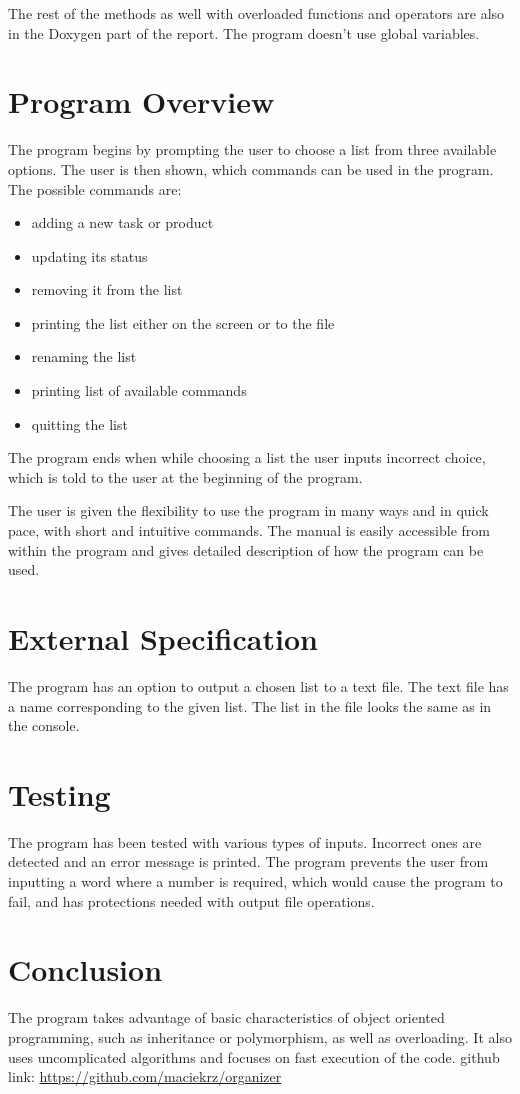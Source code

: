 \documentclass{article}
\begin{document}
The rest of the methods as well with overloaded functions and operators are also in the Doxygen part of the report.
The program doesn't use global variables.

\pagebreak

\section{Program Overview}

The program begins by prompting the user to choose a list from three available options. The user is then shown, which commands can be used in the program. The possible commands are:
\begin{itemize}
\item adding a new task or product
\item updating its status
\item removing it from the list
\item printing the list either on the screen or to the file
\item renaming the list
\item printing list of available commands
\item quitting the list
\end{itemize}
The program ends when while choosing a list the user inputs incorrect choice, which is told to the user at the beginning of the program.

The user is given the flexibility to use the program in many ways and in quick pace, with short and intuitive commands. The manual is easily accessible from within the program and gives detailed description of how the program can be used.

\section{External Specification}

The program has an option to output a chosen list to a text file. The text file has a name corresponding to the given list. The list in the file looks the same as in the console.

\section{Testing}

The program has been tested with various types of inputs. Incorrect ones are detected and an error message is printed. The program prevents the user from inputting a word where a number is required, which would cause the program to fail, and has protections needed with output file operations.

\section{Conclusion}

The program takes advantage of basic characteristics of object oriented programming, such as inheritance or polymorphism, as well as overloading. It also uses uncomplicated algorithms and focuses on fast execution of the code.
\linebreak
\linebreak
github link: \url{https://github.com/maciekrz/organizer}
\end{document}
